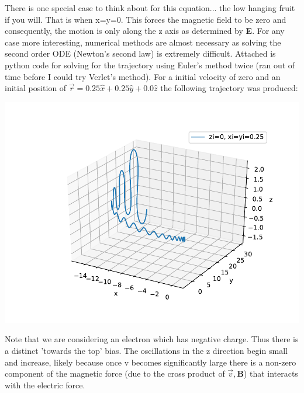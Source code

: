 \documentclass[a4paper, 11pt]{article}
\begin{document}
There is one special case to think about for this equation... the low hanging fruit if you will. That is when x=y=0. This forces the magnetic field to be zero and consequently, the motion is only along the z axis as determined by \textbf{E}. For any case more interesting, numerical methods are almost necessary as solving the second order ODE (Newton's second law) is extremely difficult. Attached is python code for solving for the trajectory using Euler's method twice (ran out of time before I could try Verlet's method). For a initial velocity of zero and an initial position of $\vec{r} = 0.25\hat{x} + 0.25\hat{y} + 0.0\hat{z}$ the following trajectory was produced: 
	\begin{center}
		\includegraphics[scale=1.0]{trajectory}
	\end{center}
Note that we are considering an electron which has negative charge. Thus there is a distinct 'towards the top' bias. The oscillations in the z direction begin small and increase, likely because once v becomes significantly large there is a non-zero component of the magnetic force (due to the cross product of $\vec{v}, \mathbf{B}$) that interacts with the electric force. 
\end{document}
